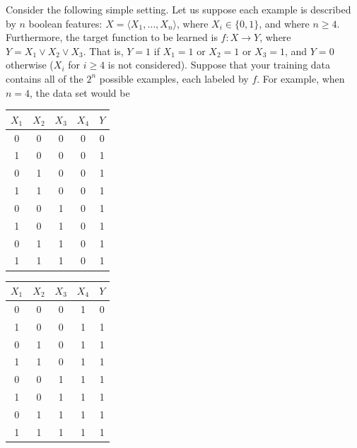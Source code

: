 \documentclass[11pt]{article}
\begin{document}
Consider the following simple setting. Let us suppose each example is described by $n$ boolean features: $X = \langle X_1, \ldots, X_n \rangle$, where $X_i \in \{0, 1\}$, and where $n \geq 4$. Furthermore, the target function to be learned is $f : X \rightarrow Y$, where $Y = X_1 \vee X_2 \vee X_3$. That is, $Y = 1$ if $X_1 = 1$ or $X_2 = 1$ or $X_3 = 1$, and $Y = 0$ otherwise ($X_i$ for $i\geq 4$ is not considered). Suppose that your training data contains all of the $2^n$ possible examples, each labeled by $f$. For example, when $n = 4$, the data set would be
\begin{table}[H]
\centering
\begin{tabular}{cccc|c}
$X_1$ & $X_2$ & $X_3$ & $X_4$ & $Y$\\ \hline
0 & 0 & 0 & 0 & 0\\
1 & 0 & 0 & 0 & 1\\
0 & 1 & 0 & 0 & 1\\
1 & 1 & 0 & 0 & 1\\
0 & 0 & 1 & 0 & 1\\
1 & 0 & 1 & 0 & 1\\
0 & 1 & 1 & 0 & 1\\
1 & 1 & 1 & 0 & 1\\
\end{tabular}
\quad \quad \quad \quad
\begin{tabular}{cccc|c}
$X_1$ & $X_2$ & $X_3$ & $X_4$ & $Y$\\ \hline
0 & 0 & 0 & 1 & 0\\
1 & 0 & 0 & 1 & 1\\
0 & 1 & 0 & 1 & 1\\
1 & 1 & 0 & 1 & 1\\
0 & 0 & 1 & 1 & 1\\
1 & 0 & 1 & 1 & 1\\
0 & 1 & 1 & 1 & 1\\
1 & 1 & 1 & 1 & 1\\
\end{tabular}
\end{table}
\end{document}
